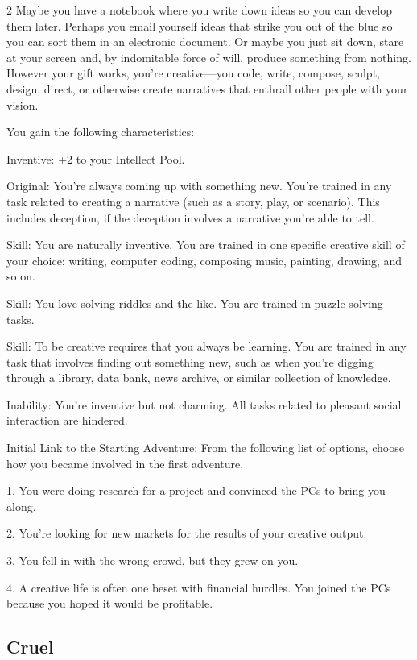 \begin{multicols}{2}
Maybe you have a notebook where you write down ideas so you can develop them later. Perhaps you email yourself ideas that strike you out of the blue so you can sort them in an electronic document. Or maybe you just sit down, stare at your screen and, by indomitable force of will, produce something from nothing. However your gift works, you’re creative—you code, write, compose, sculpt, design, direct, or otherwise create narratives that enthrall other people with your vision.

You gain the following characteristics:

Inventive: +2 to your Intellect Pool.

Original: You’re always coming up with something new. You’re trained in any task related to creating a narrative (such as a story, play, or scenario). This includes deception, if the deception involves a narrative you’re able to tell.

Skill: You are naturally inventive. You are trained in one specific creative skill of your choice: writing, computer coding, composing music, painting, drawing, and so on.

Skill: You love solving riddles and the like. You are trained in puzzle-solving tasks.

Skill: To be creative requires that you always be learning. You are trained in any task that involves finding out something new, such as when you’re digging through a library, data bank, news archive, or similar collection of knowledge.

Inability: You’re inventive but not charming. All tasks related to pleasant social interaction are hindered.

Initial Link to the Starting Adventure: From the following list of options, choose how you became involved in the first adventure.

1. You were doing research for a project and convinced the PCs to bring you along.

2. You’re looking for new markets for the results of your creative output.

3. You fell in with the wrong crowd, but they grew on you.

4. A creative life is often one beset with financial hurdles. You joined the PCs because you hoped it would be profitable.

\subsection{Cruel}


\end{multicols}
